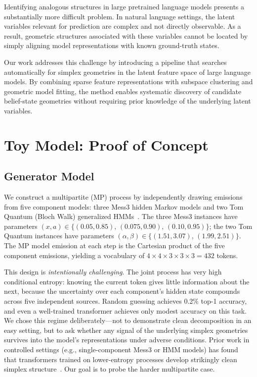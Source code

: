 \documentclass{article}
\begin{document}
Identifying analogous structures in large pretrained language models presents a substantially more difficult problem.  In natural language
settings, the latent variables relevant for prediction are complex and not directly observable.  As a result, geometric structures associated
with these variables cannot be located by simply aligning model representations with known ground-truth states.

Our work addresses this challenge by introducing a pipeline that searches automatically for simplex geometries in the latent feature
space of large language models.  By combining sparse feature representations with subspace clustering and geometric model fitting,
the method enables systematic discovery of candidate belief-state geometries without requiring prior knowledge of the underlying latent
variables.


\section{Toy Model: Proof of Concept}
\label{sec:toy}

\subsection{Generator Model}
\label{sec:toy_generator}

We construct a multipartite (MP) process by independently drawing emissions from
five component models: three Mess3 hidden Markov models and two Tom Quantum (Bloch
Walk) generalized HMMs~\citep{riechers2025quantum}.  The three Mess3 instances
have parameters $(x, a) \in \{(0.05, 0.85),\,(0.075, 0.90),\,(0.10, 0.95)\}$; the
two Tom Quantum instances have parameters $(\alpha, \beta) \in
\{(1.51, 3.07),\,(1.99, 2.51)\}$.  The MP model emission at each step is the
Cartesian product of the five component emissions, yielding a vocabulary of
$4 \times 4 \times 3 \times 3 \times 3 = 432$ tokens.

This design is \emph{intentionally challenging}.  The joint process has very high
conditional entropy: knowing the current token gives little information about the
next, because the uncertainty over each component's hidden state compounds across
five independent sources.  Random guessing achieves 0.2\% top-1 accuracy, and even
a well-trained transformer achieves only modest accuracy on this task.  We chose
this regime deliberately---not to demonstrate clean decomposition in an easy setting,
but to ask whether any signal of the underlying simplex geometries survives into the
model's representations under adverse conditions.  Prior work in controlled settings
(e.g., single-component Mess3 or HMM models) has found that transformers trained on
lower-entropy processes develop strikingly clean simplex structure~\citep{simplex_prior}.
Our goal is to probe the harder multipartite case.
\end{document}
